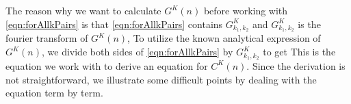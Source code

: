 The reason why we want to calculate $G^{K}(n)$ before working with \autoref{eqn:forAllkPairs} is that
 \autoref{eqn:forAllkPairs}  contains $G^{K}_{k_1, k_2}$ and $G^{K}_{k_1, k_2}$ is the fourier transform of  $G^{K}(n)$,
To utilize the known analytical expression of $G^{K}(n)$, we divide both sides of \autoref{eqn:forAllkPairs} by
$G^{K}_{k_1, k_2}$ to get
This is the equation we work with to derive an equation for $C^{K}(n)$. Since the derivation is not straightforward, we
illustrate some difficult points by dealing with the equation term by term.  

